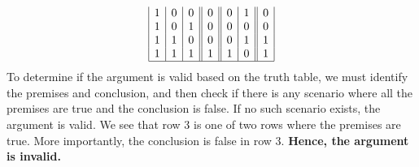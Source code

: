 \begin{enumerate}[label=(\alph*)]
\[\begin{array}{|c|c|c||c||c|c||c|}
    1 & 0 & 0 & 0 & 0 & 1 & 0 \\
    1 & 0 & 1 & 0 & 0 & 0 & 0 \\
    1 & 1 & 0 & 0 & 0 & 1 & 1 \\
    1 & 1 & 1 & 1 & 1 & 0 & 1 \\
    \hline
    \end{array}
    \]
    To determine if the argument is valid based on the truth table, we must identify the premises and conclusion, and then check if there is any scenario where all the premises are true and the conclusion is false. If no such scenario exists, the argument is valid. We see that row 3 is one of two rows where the premises are true. More importantly, the conclusion is false in row 3. \textbf{Hence, the argument is invalid.}
\end{enumerate}
\pagebreak